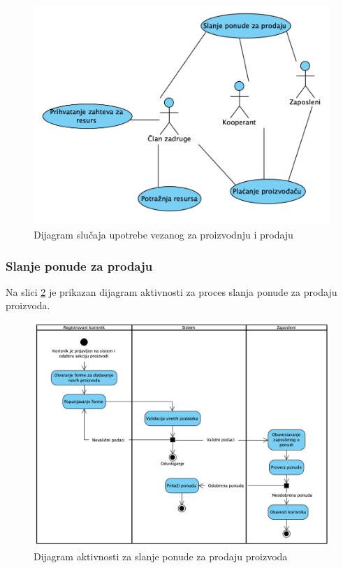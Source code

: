 \documentclass[a4paper]{article}
\begin{document}

\begin{figure}[h!]
    \centering
    \includegraphics[scale=0.64]{images/dslucup_proizvodnja_prodaja.png}
    \caption{Dijagram slučaja upotrebe vezanog za proizvodnju i prodaju}
    \label{dslucup_proizvodnja_prodaja}
\end{figure}

\clearpage

\subsubsection{Slanje ponude za prodaju}

Na slici \ref{dakt_slanje_ponude_za_prodaju} je prikazan dijagram aktivnosti za proces slanja ponude za prodaju proizvoda.
\begin{figure}[h!]
    \centering
    \includegraphics[scale=0.5]{images/dakt_slanje_ponude_za_prodaju.png}
    \caption{Dijagram aktivnosti za slanje ponude za prodaju proizvoda}
    \label{dakt_slanje_ponude_za_prodaju}
\end{figure}
\end{document}
